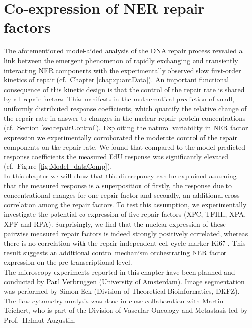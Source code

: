 \chapter{Co-expression of NER repair factors}
\label{chap:crossCorell}
The aforementioned model-aided analysis of the DNA repair process revealed a link between the emergent phenomenon of rapidly exchanging and transiently interacting NER components with the experimentally observed slow first-order kinetics of repair (cf.\ Chapter \ref{chap:quantData}). An important functional consequence of this kinetic design is that the control of the repair rate is shared by all repair factors. This manifests in the mathematical prediction of small, uniformly distributed response coefficients, which quantify the relative change of the repair rate in answer to changes in the nuclear repair protein concentrations (cf.\ Section \ref{sec:repairControl}). Exploiting the natural variability in NER factor expression we experimentally corroborated the moderate control of the repair components on the repair rate. We found that compared to the model-predicted response coefficients the measured EdU response was significantly elevated (cf.\ Figure \ref{fig:Model_dataComp}). \\ 
In this chapter we will show that this discrepancy can be explained assuming that the measured response is a superposition of firstly, the response due to concentrational changes for one repair factor and secondly, an additional cross-correlation among the repair factors. To test this assumption, we experimentally investigate the potential co-expression of five repair factors (XPC, TFIIH, XPA, XPF and RPA). Surprisingly, we find that the nuclear expression of these pairwise measured repair factors is indeed strongly positively correlated, whereas there is no correlation with the repair-independent cell cycle marker Ki67 \cite{Scholzen2000}. This result suggests an additional control mechanism orchestrating NER factor expression on the pre-transcriptional level.\\ 

The microscopy experiments reported in this chapter have been planned and conducted by Paul Verbruggen (University of Amsterdam). Image segmentation was performed by Simon Eck (Division of Theoretical Bioinformatics, DKFZ). The flow cytometry analysis was done in close collaboration with Martin Teichert, who is part of the Division of Vascular Oncology and Metastasis led by Prof.\ Helmut Augustin. 
 



